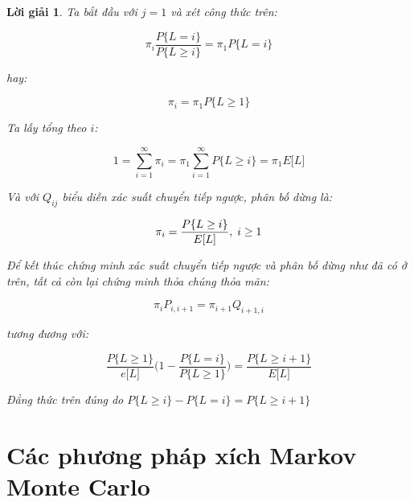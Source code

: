 \documentclass[14pt, a4paper]{article}
\numberwithin{equation}{section}
\numberwithin{figure}{section}
\theoremstyle{sltheorem}
\theoremstyle{soltheorem}
\newtheorem*{loigiai}{Lời giải}
\numberwithin{dl}{section}
\numberwithin{md}{section}
\numberwithin{vd}{section}
\begin{document}
\begin{loigiai}
        Ta bắt đầu với $j=1$ và xét công thức trên:

        \begin{equation*}
            \pi_i \dfrac{P \lbrace L = i \rbrace}{P \lbrace L \geq i \rbrace} = \pi_1 P \lbrace L = i \rbrace
        \end{equation*}

        hay:

        \begin{equation*}
            \pi_i = \pi_1 P \lbrace L \geq 1 \rbrace
        \end{equation*}

        Ta lấy tổng theo $i$:

        \begin{equation*}
            1 = \sum_{i=1}^{\infty} \pi_i = \pi_1 \sum_{i=1}^{\infty} P \lbrace L \geq i \rbrace = \pi_1 E \lbrack L \rbrack
        \end{equation*}

        Và với $Q_{ij}$ biểu diễn xác suất chuyển tiếp ngược, phân bố dừng là:

        \begin{equation*}
            \pi_i = \dfrac{P \lbrace L \geq i \rbrace}{E \lbrack L \rbrack}, \thickspace i \geq 1
        \end{equation*}

        Để kết thúc chứng minh xác suất chuyển tiếp ngược và phân bố dừng như đã có ở trên, tất cả còn lại chứng minh thỏa chúng thỏa mãn:

        \begin{equation*}
            \pi_i P_{i, i+1} = \pi_{i+1} Q_{i+1, i}
        \end{equation*}

        tương đương với:

        \begin{equation*}
            \dfrac{P \lbrace L \geq 1 \rbrace}{e \lbrack L \rbrack} \Bigg (1 - \dfrac{P \lbrace L = i \rbrace}{P \lbrace L \geq 1 \rbrace} \Bigg) = \dfrac{P \lbrace L \geq i + 1 \rbrace}{E \lbrack L \rbrack}
        \end{equation*}

        Đẳng thức trên đúng do $P \lbrace L \geq i \rbrace - P \lbrace L = i \rbrace = P \lbrace L \geq i + 1 \rbrace$
    \end{loigiai}

    \section{Các phương pháp xích Markov Monte Carlo}
\end{document}
